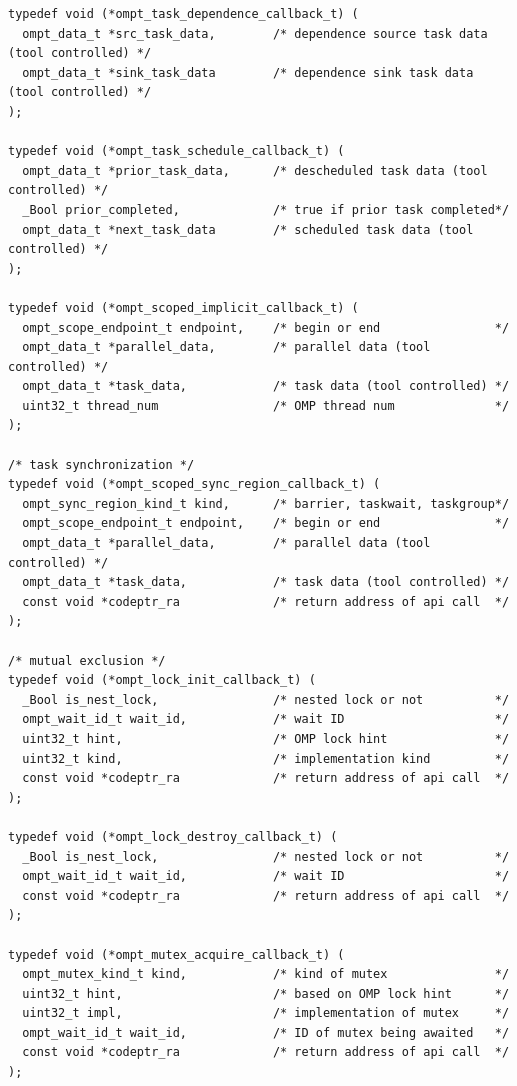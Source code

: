 \documentclass{article}
\begin{document}
\begin{verbatim}
typedef void (*ompt_task_dependence_callback_t) (
  ompt_data_t *src_task_data,        /* dependence source task data (tool controlled) */
  ompt_data_t *sink_task_data        /* dependence sink task data (tool controlled) */
);

typedef void (*ompt_task_schedule_callback_t) (
  ompt_data_t *prior_task_data,      /* descheduled task data (tool controlled) */
  _Bool prior_completed,             /* true if prior task completed*/
  ompt_data_t *next_task_data        /* scheduled task data (tool controlled) */
);

typedef void (*ompt_scoped_implicit_callback_t) ( 
  ompt_scope_endpoint_t endpoint,    /* begin or end                */
  ompt_data_t *parallel_data,        /* parallel data (tool controlled) */
  ompt_data_t *task_data,            /* task data (tool controlled) */
  uint32_t thread_num                /* OMP thread num              */
);

/* task synchronization */
typedef void (*ompt_scoped_sync_region_callback_t) ( 
  ompt_sync_region_kind_t kind,      /* barrier, taskwait, taskgroup*/
  ompt_scope_endpoint_t endpoint,    /* begin or end                */ 
  ompt_data_t *parallel_data,        /* parallel data (tool controlled) */
  ompt_data_t *task_data,            /* task data (tool controlled) */
  const void *codeptr_ra             /* return address of api call  */
);

/* mutual exclusion */
typedef void (*ompt_lock_init_callback_t) (
  _Bool is_nest_lock,                /* nested lock or not          */
  ompt_wait_id_t wait_id,            /* wait ID                     */
  uint32_t hint,                     /* OMP lock hint               */
  uint32_t kind,                     /* implementation kind         */
  const void *codeptr_ra             /* return address of api call  */
);

typedef void (*ompt_lock_destroy_callback_t) (
  _Bool is_nest_lock,                /* nested lock or not          */
  ompt_wait_id_t wait_id,            /* wait ID                     */
  const void *codeptr_ra             /* return address of api call  */
);

typedef void (*ompt_mutex_acquire_callback_t) ( 
  ompt_mutex_kind_t kind,            /* kind of mutex               */
  uint32_t hint,                     /* based on OMP lock hint      */
  uint32_t impl,                     /* implementation of mutex     */
  ompt_wait_id_t wait_id,            /* ID of mutex being awaited   */
  const void *codeptr_ra             /* return address of api call  */          
);


\end{verbatim}
\end{document}
